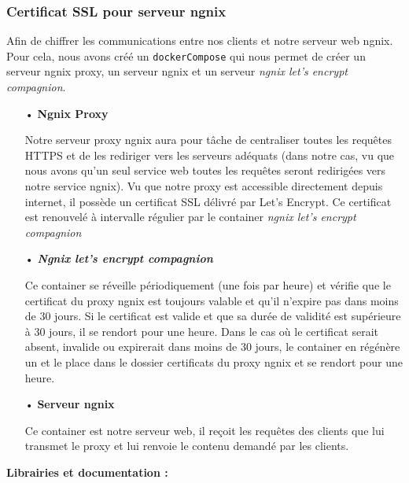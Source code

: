 \documentclass[12pt]{article}
\begin{document}
\subsubsection{Certificat SSL pour serveur ngnix}

Afin de chiffrer les communications entre nos clients et notre serveur web ngnix.
Pour cela, nous avons créé un \texttt{dockerCompose} qui nous permet de créer un serveur ngnix proxy, un serveur ngnix et un serveur \emph{ngnix let's encrypt compagnion}.
\medskip

\begin{itemize}

\item[•] \textbf{Ngnix Proxy}
\vspace{1mm}

Notre serveur proxy ngnix aura pour tâche de centraliser toutes les requêtes HTTPS et de les rediriger vers les serveurs adéquats (dans notre cas, vu que nous avons qu'un seul service web toutes les requêtes seront redirigées vers notre service ngnix).
Vu que notre proxy est accessible directement depuis internet, il possède un certificat SSL délivré par Let's Encrypt.
Ce certificat est renouvelé à intervalle régulier par le container \emph{ngnix let's encrypt compagnion}
\vspace{3mm}

\item[•] \textbf{\emph{Ngnix let's encrypt compagnion}}
\vspace{1mm}

Ce container se réveille périodiquement (une fois par heure) et vérifie que le certificat du proxy ngnix est toujours valable et qu'il n'expire pas dans moins de 30 jours. 
Si le certificat est valide et que sa durée de validité est supérieure à 30 jours, il se rendort pour une heure.
Dans le cas où le certificat serait absent, invalide ou expirerait dans moins de 30 jours, le container en régénère un et le place dans le dossier certificats du proxy ngnix et se rendort pour une heure.
\vspace{3mm}

\item[•] \textbf{Serveur ngnix}
\vspace{1mm}

Ce container est notre serveur web, il reçoit les requêtes des clients que lui transmet le proxy et lui renvoie le contenu demandé par les clients.
\end{itemize}

\medskip
\textbf{Librairies et documentation :}
\end{document}
